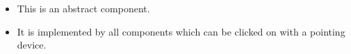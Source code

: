\begin{itemize}
\item This is an abstract component.
\item It is implemented by all components which can be clicked on with a pointing device.
\end{itemize}

